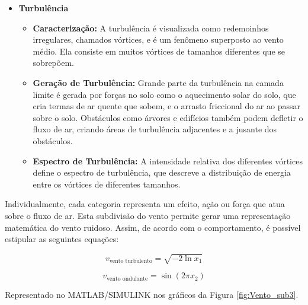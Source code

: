 \begin{itemize}
    \item \textbf{Turbulência}
    \begin{itemize}
        \item \textbf{Caracterização:} A turbulência é visualizada como redemoinhos irregulares, chamados vórtices, e é um fenômeno superposto ao vento médio. Ela consiste em muitos vórtices de tamanhos diferentes que se sobrepõem.
        \item \textbf{Geração de Turbulência:} Grande parte da turbulência na camada limite é gerada por forças no solo como o aquecimento solar do solo, que cria termas de ar quente que sobem, e o arrasto friccional do ar ao passar sobre o solo. Obstáculos como árvores e edifícios também podem defletir o fluxo de ar, criando áreas de turbulência adjacentes e a jusante dos obstáculos.
        \item \textbf{Espectro de Turbulência:} A intensidade relativa dos diferentes vórtices define o espectro de turbulência, que descreve a distribuição de energia entre os vórtices de diferentes tamanhos.
    \end{itemize}
\end{itemize}

\par Individualmente, cada categoria representa um efeito, ação ou força que atua sobre o fluxo de ar. Esta subdivisão do vento permite gerar uma representação matemática do vento ruidoso. Assim, de acordo com o comportamento, é possível estipular as seguintes equações:

\begin{equation}
 v_{\text{vento turbulento}} = \sqrt{-2 \ln x_1}
 \label{eq:ventoTurbulento}
\end{equation}

\begin{equation}
v_{\text{vento ondulante}} = \sin(2\pi x_2)
\label{eq:ventoOndulante}
\end{equation}

\par Representado no MATLAB/SIMULINK nos gráficos da Figura \ref{fig:Vento_sub3}.

